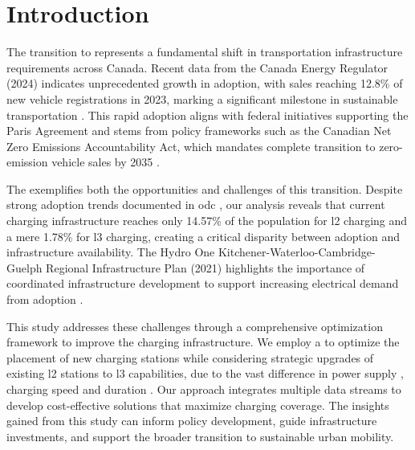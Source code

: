 \chapter{Introduction}

The transition to  represents a fundamental shift in transportation infrastructure requirements across Canada. Recent data from the Canada Energy Regulator (2024) indicates unprecedented growth in  adoption, with sales reaching 12.8\% of new vehicle registrations in 2023, marking a significant milestone in sustainable transportation \cite{cer2024}. This rapid adoption aligns with federal initiatives supporting the Paris Agreement and stems from policy frameworks such as the Canadian Net Zero Emissions Accountability Act, which mandates complete transition to zero-emission vehicle sales by 2035 \cite{emissions2024}.

The  exemplifies both the opportunities and challenges of this transition. Despite strong  adoption trends documented in \gls{odc} \cite{ontario2024}, our analysis reveals that current charging infrastructure reaches only 14.57\% of the population for \gls{l2} charging and a mere 1.78\% for \gls{l3} charging, creating a critical disparity between  adoption and infrastructure availability. The Hydro One Kitchener-Waterloo-Cambridge-Guelph Regional Infrastructure Plan (2021) highlights the importance of coordinated infrastructure development to support increasing electrical demand from  adoption \cite{hydro2021} \cite{hydro2024}.

This study addresses these challenges through a comprehensive optimization framework to improve the   charging infrastructure. We employ a  to optimize the placement of new charging stations while considering strategic upgrades of existing \gls{l2} stations to \gls{l3} capabilities, due to the vast difference in power supply \cite{bao2021}, charging speed \cite{berrehil2023} and duration \cite{chon2018}. Our approach integrates multiple data streams to develop cost-effective solutions that maximize charging coverage. The insights gained from this study can inform policy development, guide infrastructure investments, and support the broader transition to sustainable urban mobility.